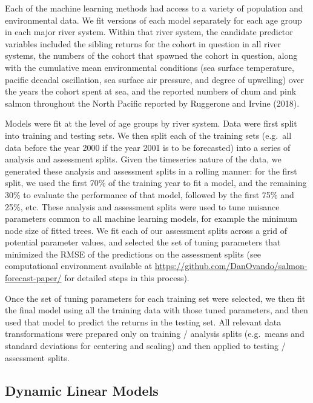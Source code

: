 \documentclass[
]{article}
\begin{document}
Each of the machine learning methods had access to a variety of population and environmental data. We fit versions of each model separately for each age group in each major river system. Within that river system, the candidate predictor variables included the sibling returns for the cohort in question in all river systems, the numbers of the cohort that spawned the cohort in question, along with the cumulative mean environmental conditions (sea surface temperature, pacific decadal oscillation, sea surface air pressure, and degree of upwelling) over the years the cohort spent at sea, and the reported numbers of chum and pink salmon throughout the North Pacific reported by Ruggerone and Irvine (2018).

Models were fit at the level of age groups by river system. Data were first split into training and testing sets. We then split each of the training sets (e.g.~all data before the year 2000 if the year 2001 is to be forecasted) into a series of analysis and assessment splits. Given the timeseries nature of the data, we generated these analysis and assessment splits in a rolling manner: for the first split, we used the first 70\% of the training year to fit a model, and the remaining 30\% to evaluate the performance of that model, followed by the first 75\% and 25\%, etc. These analysis and assessment splits were used to tune nuisance parameters common to all machine learning models, for example the minimum node size of fitted trees. We fit each of our assessment splits across a grid of potential parameter values, and selected the set of tuning parameters that minimized the RMSE of the predictions on the assessment splits (see computational environment available at \url{https://github.com/DanOvando/salmon-forecast-paper/} for detailed steps in this process).

Once the set of tuning parameters for each training set were selected, we then fit the final model using all the training data with those tuned parameters, and then used that model to predict the returns in the testing set. All relevant data transformations were prepared only on training / analysis splits (e.g.~means and standard deviations for centering and scaling) and then applied to testing / assessment splits.

\hypertarget{dynamic-linear-models}{%
\subsection*{Dynamic Linear Models}\label{dynamic-linear-models}}
\end{document}
